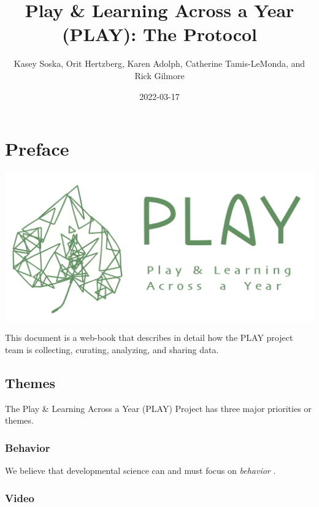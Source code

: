 \documentclass[
  12pt,
]{book}
\title{Play \& Learning Across a Year (PLAY): The Protocol}
\author{Kasey Soska, Orit Hertzberg, Karen Adolph, Catherine Tamis-LeMonda, and Rick Gilmore}
\date{2022-03-17}
\begin{document}
\maketitle

{
\setcounter{tocdepth}{1}
\tableofcontents
}
\hypertarget{preface}{%
\chapter*{Preface}\label{preface}}

\begin{center}\href{https://play-project.org}{\includegraphics[width=0.7\linewidth]{img/PLAY-logo} }\end{center}

This document is a web-book that describes in detail how the PLAY project team is collecting, curating, analyzing, and sharing data.

\hypertarget{themes}{%
\section*{Themes}\label{themes}}

The Play \& Learning Across a Year (PLAY) Project has three major priorities or themes.

\hypertarget{behavior}{%
\subsection*{Behavior}\label{behavior}}

We believe that developmental science can and must focus on \emph{behavior} \citep{Adolph2020-rj}.

\hypertarget{video}{%
\subsection*{Video}\label{video}}
\end{document}
